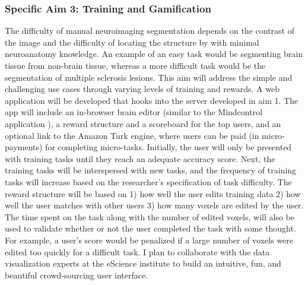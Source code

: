 

\subsubsection*{Specific Aim 3: Training and Gamification}

The difficulty of manual neuroimaging segmentation depends on the contrast of the image and the difficulty of locating the structure by with minimal neuroanatomy knowledge. An example of an easy task would be segmenting brain tissue from non-brain tissue, whereas a more difficult task would be the segmentation of multiple sclerosis lesions. This aim will address the simple and challenging use cases through varying levels of training and rewards. A web application will be developed that hooks into the server developed in aim 1. The app will include an in-browser brain editor (similar to the Mindcontrol application \cite{keshavan2016mindcontrol}), a reward structure and a scoreboard for the top users, and an optional link to the Amazon Turk engine, where users can be paid (in micro-payments) for completing micro-tasks. Initially, the user will only be presented with training tasks until they reach an adequate accuracy score. Next, the training tasks will be interspersed with new tasks, and the frequency of training tasks will increase based on the researcher's specification of task difficulty. The reward structure will be based on 1) how well the user edits training data 2) how well the user matches with other users 3) how many voxels are edited by the user. The time spent on the task along with the number of edited voxels, will also be used to validate whether or not the user completed the task with some thought. For example, a user's score would be penalized if a large number of voxels were edited too quickly for a difficult task. I plan to collaborate with the data visualization experts at the eScience institute to build an intuitive, fun, and beautiful crowd-sourcing user interface.